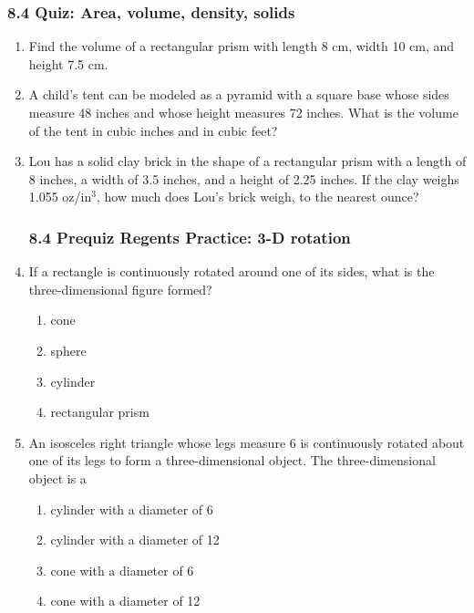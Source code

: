 \documentclass[12pt, twoside]{article}
\begin{document}
\subsubsection*{8.4 Quiz: Area, volume, density, solids}
\begin{enumerate}
\item Find the volume of a rectangular prism with length 8 cm, width 10 cm, and height 7.5 cm. \vspace{3cm}

\item A child's tent can be modeled as a pyramid with a square base whose sides measure 48 inches and whose height measures 72 inches. What is the volume of the tent in cubic inches and in cubic feet? \vspace{5cm}

\item Lou has a solid clay brick in the shape of a rectangular prism with a length of 8 inches, a width of 3.5 inches, and a height of 2.25 inches. If the clay weighs 1.055 oz/in$^3$, how much does Lou's brick weigh, to the nearest ounce? \vspace{4cm}


\newpage
\subsubsection*{8.4 Prequiz Regents Practice: 3-D rotation}
\item If a rectangle is continuously rotated around one of its sides, what is the three-dimensional figure formed?
  \begin{multicols}{2}
  \begin{enumerate}
    \item cone
    \item sphere
    \item cylinder
    \item rectangular prism
  \end{enumerate}
\end{multicols}

\item An isosceles right triangle whose legs measure 6 is continuously rotated about one of its legs to form a three-dimensional object. The three-dimensional object is a
\begin{multicols}{2}
    \begin{enumerate}
    \item cylinder with a diameter of 6
    \item cylinder with a diameter of 12
    \item cone with a diameter of 6
    \item cone with a diameter of 12
  \end{enumerate}
\end{multicols}


\end{enumerate}
\end{document}
